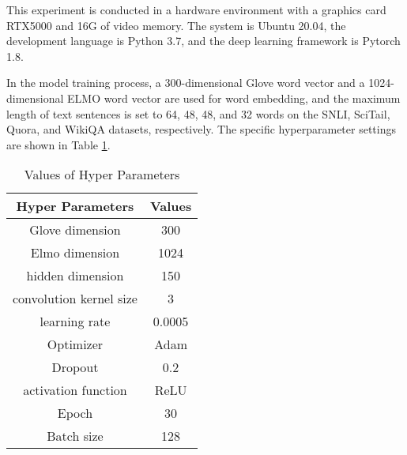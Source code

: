 \documentclass[review]{elsarticle}
\begin{document}
This experiment is conducted in a hardware environment with a graphics card RTX5000 and 16G of video memory. The system is Ubuntu 20.04, the development language is Python 3.7, and the deep learning framework is Pytorch 1.8.

In the model training process, a 300-dimensional Glove word vector and a 1024-dimensional ELMO word vector are used for word embedding, and the maximum length of text sentences is set to 64, 48, 48, and 32 words on the SNLI, SciTail, Quora, and WikiQA datasets, respectively. The specific hyperparameter settings are shown in Table \ref{tab:2}.
\begin{table}[htbp]
 \centering
  \caption{\label{tab:2}Values of Hyper Parameters}
\begin{tabular}{cc}
 \toprule
Hyper Parameters & Values\\
 \midrule
Glove dimension & 300 \\
Elmo dimension & 1024 \\
hidden dimension & 150 \\
convolution kernel size & 3 \\
learning rate & 0.0005 \\
Optimizer & Adam \\
Dropout & 0.2 \\
activation function & ReLU \\
Epoch & 30 \\
Batch size & 128 \\
\bottomrule
 \end{tabular}
\end{table}
\end{document}
